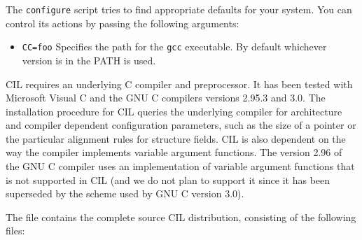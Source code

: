 \documentclass{article}
\def\t#1{{\tt #1}}
\begin{document}
 The \t{configure} script tries to find appropriate defaults for your system.
You can control its actions by passing the following arguments:
\begin{itemize}
\item \t{CC=foo} Specifies the path for the \t{gcc} executable. By default
whichever version is in the PATH is used.
\end{itemize}

 CIL requires an underlying C compiler and preprocessor. It has been tested
with Microsoft Visual C and the GNU C compilers versions 2.95.3 and 3.0. The
installation procedure for CIL queries the underlying compiler for architecture
and compiler dependent configuration parameters, such as the size of a pointer
or the particular alignment rules for structure fields. CIL is also dependent
on the way the compiler implements variable argument functions. The version
2.96 of the GNU C compiler uses an implementation of variable argument
functions that is not supported in CIL (and we do not plan to support it since
it has been superseded by the scheme used by GNU C version 3.0).

The file  contains the complete source CIL
distribution, consisting of the following files:
\end{document}
